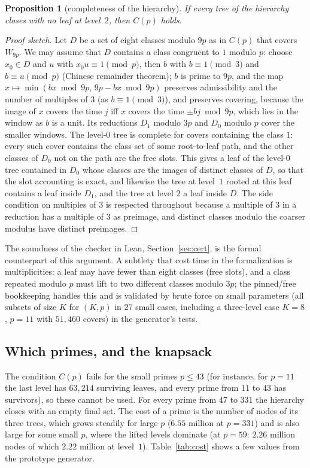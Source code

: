 \documentclass[11pt]{article}
\newtheorem{proposition}[theorem]{Proposition}
\theoremstyle{remark}
\begin{document}
\begin{proposition}[completeness of the hierarchy]\label{prop:hier}
If every tree of the hierarchy closes with no leaf at level~$2$, then $C(p)$ holds.
\end{proposition}
\begin{proof}[Proof sketch]
Let $D$ be a set of eight classes modulo $9p$ as in $C(p)$ that covers $W_{9p}$. We may assume that $D$ contains a class congruent to $1$ modulo $p$: choose $x_0\in D$ and $u$ with $x_0u\equiv1\pmod p$, then $b$ with $b\equiv1\pmod3$ and $b\equiv u\pmod p$ (Chinese remainder theorem); $b$ is prime to $9p$, and the map $x\mapsto\min(bx\bmod9p,\,9p-bx\bmod9p)$ preserves admissibility and the number of multiples of $3$ (as $b\equiv1\pmod 3$), and preserves covering, because the image of $x$ covers the time $j$ iff $x$ covers the time $\pm bj\bmod 9p$, which lies in the window as $b$ is a unit. Its reductions $D_1$ modulo $3p$ and $D_0$ modulo $p$ cover the smaller windows. The level-$0$ tree is complete for covers containing the class $1$: every such cover contains the class set of some root-to-leaf path, and the other classes of $D_0$ not on the path are the free slots. This gives a leaf of the level-$0$ tree contained in $D_0$ whose classes are the images of distinct classes of $D$, so that the slot accounting is exact, and likewise the tree at level~$1$ rooted at this leaf contains a leaf inside $D_1$, and the tree at level $2$ a leaf inside $D$. The side condition on multiples of $3$ is respected throughout because a multiple of $3$ in a reduction has a multiple of $3$ as preimage, and distinct classes modulo the coarser modulus have distinct preimages.
\end{proof}
The soundness of the checker in Lean, Section~\ref{sec:cert}, is the formal counterpart of this argument. A subtlety that cost time in the formalization is multiplicities: a leaf may have fewer than eight classes (free slots), and a class repeated modulo $p$ must lift to two different classes modulo $3p$; the pinned/free bookkeeping handles this and is validated by brute force on small parameters (all subsets of size $K$ for $(K,p)$ in $27$ small cases, including a three-level case $K=8$, $p=11$ with $51{,}460$ covers) in the generator's tests.

\subsection{Which primes, and the knapsack}

The condition $C(p)$ fails for the small primes $p\le43$ (for instance, for $p=11$ the last level has $63{,}214$ surviving leaves, and every prime from $11$ to $43$ has survivors), so these cannot be used. For every prime from $47$ to $331$ the hierarchy closes with an empty final set. The cost of a prime is the number of nodes of its three trees, which grows steadily for large $p$ ($6.55$ million at $p=331$) and is also large for some small $p$, where the lifted levels dominate (at $p=59$: $2.26$ million nodes of which $2.22$ million at level~$1$). Table~\ref{tab:cost} shows a few values from the prototype generator.
\end{document}
